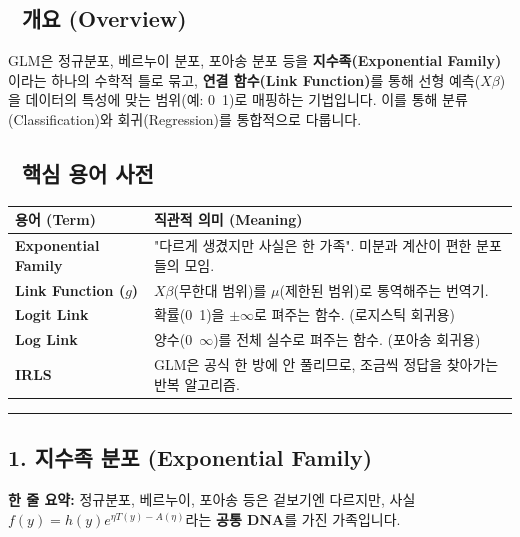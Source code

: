 \documentclass[11pt,a4paper]{book}
\theoremstyle{definition}
\begin{document}
\subsection*{📌 개요 (Overview)}
GLM은 정규분포, 베르누이 분포, 포아송 분포 등을 \textbf{지수족(Exponential Family)}이라는 하나의 수학적 틀로 묶고, \textbf{연결 함수(Link Function)}를 통해 선형 예측($X\beta$)을 데이터의 특성에 맞는 범위(예: 0~1)로 매핑하는 기법입니다. 이를 통해 분류(Classification)와 회귀(Regression)를 통합적으로 다룹니다.

\subsection*{📝 핵심 용어 사전}
\begin{table}[h]
\centering
\begin{tabularx}{\textwidth}{|p{}|X|}
\hline
\textbf{용어 (Term)} & \textbf{직관적 의미 (Meaning)} \\
\hline
\textbf{Exponential Family} & "다르게 생겼지만 사실은 한 가족". 미분과 계산이 편한 분포들의 모임. \\
\hline
\textbf{Link Function ($g$)} & $X\beta$(무한대 범위)를 $\mu$(제한된 범위)로 통역해주는 번역기. \\
\hline
\textbf{Logit Link} & 확률(0~1)을 $\pm\infty$로 펴주는 함수. (로지스틱 회귀용) \\
\hline
\textbf{Log Link} & 양수(0~$\infty$)를 전체 실수로 펴주는 함수. (포아송 회귀용) \\
\hline
\textbf{IRLS} & GLM은 공식 한 방에 안 풀리므로, 조금씩 정답을 찾아가는 반복 알고리즘. \\
\hline
\end{tabularx}
\end{table}

\vspace{0.5cm}\hrule\vspace{0.5cm}

\subsection{1. 지수족 분포 (Exponential Family)}

\begin{conceptbox}[title={개념 1: 통계학의 만능 플랫폼}]
\textbf{한 줄 요약:} 정규분포, 베르누이, 포아송 등은 겉보기엔 다르지만, 사실 $f(y) = h(y)e^{\eta T(y) - A(\eta)}$라는 \textbf{공통 DNA}를 가진 가족입니다.
\end{conceptbox}
\end{document}
